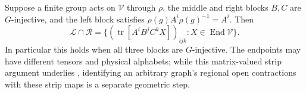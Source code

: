 \begin{lemma}%
    \label{thm:peps_g_injective_strip_intersection}
    \leanok
    Suppose a finite group acts on $\mathcal V$ through $\rho$, the
    middle and right blocks $B,C$ are $G$-injective, and the left block
    satisfies $\rho(g)A^i\rho(g)^{-1}=A^i$. Then
    \[
        \mathcal L\cap\mathcal R
        =\{(\operatorname{tr}[A^iB^jC^kX])_{ijk}
        :X\in\operatorname{End}\mathcal V\}.
    \]
    In particular this holds when all three blocks are $G$-injective.
    The endpoints may have different tensors and physical alphabets;
    while this matrix-valued strip argument underlies
    \cite[Theorems~4.8 and~5.4]{Schuch2010PEPS}, identifying an arbitrary
    graph's regional open contractions with these strip maps is a
    separate geometric step.
\end{lemma}

